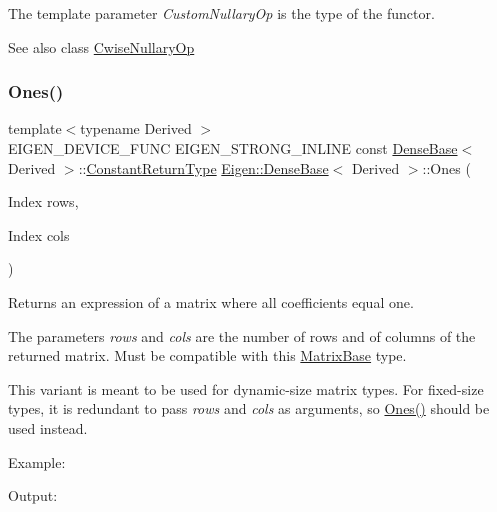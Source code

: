 The template parameter {\itshape Custom\+Nullary\+Op} is the type of the functor.

\begin{DoxySeeAlso}{See also}
class \mbox{\hyperlink{class_eigen_1_1_cwise_nullary_op}{Cwise\+Nullary\+Op}} 
\end{DoxySeeAlso}
\mbox{\label{class_eigen_1_1_dense_base_adb1ce2c904a1eb3f3bab81ced1b916b6}} 
\subsubsection{\texorpdfstring{Ones()}{Ones()}\hspace{0.1cm}{\footnotesize\ttfamily [1/3]}}
{\footnotesize\ttfamily template$<$typename Derived $>$ \\
E\+I\+G\+E\+N\+\_\+\+D\+E\+V\+I\+C\+E\+\_\+\+F\+U\+NC E\+I\+G\+E\+N\+\_\+\+S\+T\+R\+O\+N\+G\+\_\+\+I\+N\+L\+I\+NE const \mbox{\hyperlink{class_eigen_1_1_dense_base}{Dense\+Base}}$<$ Derived $>$\+::\mbox{\hyperlink{class_eigen_1_1_cwise_nullary_op}{Constant\+Return\+Type}} \mbox{\hyperlink{class_eigen_1_1_dense_base}{Eigen\+::\+Dense\+Base}}$<$ Derived $>$\+::Ones (\begin{DoxyParamCaption}\item[{Index}]{rows,  }\item[{Index}]{cols }\end{DoxyParamCaption})\hspace{0.3cm}{\ttfamily [static]}}

\begin{DoxyReturn}{Returns}
an expression of a matrix where all coefficients equal one.
\end{DoxyReturn}
The parameters {\itshape rows} and {\itshape cols} are the number of rows and of columns of the returned matrix. Must be compatible with this \mbox{\hyperlink{class_eigen_1_1_matrix_base}{Matrix\+Base}} type.

This variant is meant to be used for dynamic-\/size matrix types. For fixed-\/size types, it is redundant to pass {\itshape rows} and {\itshape cols} as arguments, so \mbox{\hyperlink{class_eigen_1_1_dense_base_a1284a38971d817c33e40c226f6347e37}{Ones()}} should be used instead.

Example\+: 
\begin{DoxyCodeInclude}{0}
\end{DoxyCodeInclude}
 Output\+: 
\begin{DoxyVerbInclude}
\end{DoxyVerbInclude}


